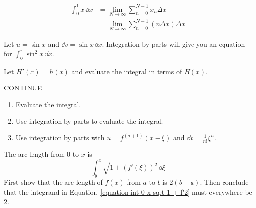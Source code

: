 

\begin{Hint}
  \label{hint int by sum x}
  \begin{align*}
    \int_0^1 x \,\dd x
    &= \lim_{N \to \infty} \sum_{n=0}^{N-1} x_n \Delta x \\
    &= \lim_{N \to \infty} \sum_{n=0}^{N-1} (n \Delta x) \Delta x 
  \end{align*}
\end{Hint}



\begin{Hint}
  \label{hint int 0 pi sin2 x}
  Let $u=\sin x$ and $\dd v = \sin x \,\dd x$.  Integration by parts will give you
  an equation for $\int_0^\pi \sin^2 x \,\dd x$.
\end{Hint}





\begin{Hint}
  \label{hint d/dx int g f h}
  Let $H'(x) = h(x)$ and evaluate the integral in terms of $H(x)$.
\end{Hint}






\begin{Hint}
  \label{hint area x xn}
  CONTINUE
\end{Hint}



\begin{Hint}
  \label{hint taylor series integral}
  \renewcommand{\theenumi}{\alph{enumi}}
  \begin{enumerate}
  \item
    Evaluate the integral.
  \item
    Use integration by parts to evaluate the integral.
  \item
    Use integration by parts with $u = f^{(n+1)}(x-\xi)$ and 
    $\dd v = \frac{1}{n!} \xi^n$.
  \end{enumerate}
  \renewcommand{\theenumi}{\arabic{enumi}}
\end{Hint}



\begin{Hint}
  \label{hint arclength 0 x 2x}
  The arc length from $0$ to $x$ is
  \begin{equation}
    \label{equation int 0 x sqrt 1 + f'2}
  \int_0^x \sqrt{1 + (f'(\xi))^2} \,\dd \xi
  \end{equation}
  First show that the arc length of $f(x)$ from $a$ to $b$ is $2 (b - a)$.
  Then conclude that the integrand in 
  Equation~\ref{equation int 0 x sqrt 1 + f'2}
  must everywhere be $2$.
\end{Hint}







